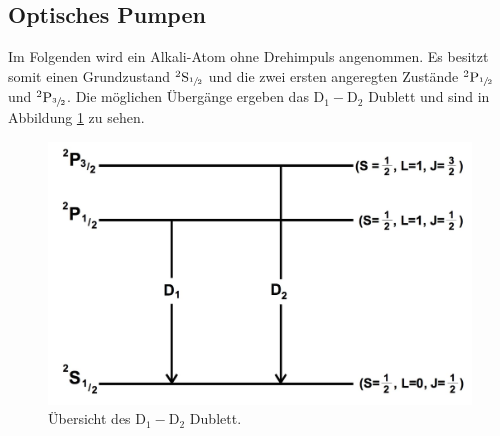 \subsection{Optisches Pumpen}
Im Folgenden wird ein Alkali-Atom ohne Drehimpuls angenommen. Es besitzt somit einen Grundzustand ${}^2\text{S}_{\sfrac{1}{2}}$ und die zwei ersten angeregten Zustände ${}^2\text{P}_{\sfrac{1}{2}}$ und ${}^2\text{P}_{\sfrac{3}{2}}$. Die möglichen Übergänge ergeben das $\text{D}_1-\text{D}_2$ Dublett und sind in Abbildung \ref{fig:dublett} zu sehen.
\begin{figure}[H]
	\centering
	\includegraphics[width=0.8\linewidth]{img/dublett.jpg}
	\caption{Übersicht des $\text{D}_1-\text{D}_2$ Dublett.\cite{V21}}
	\label{fig:dublett}
\end{figure}

